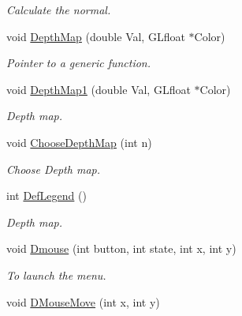 \begin{DoxyCompactItemize}
\begin{DoxyCompactList}\small\item\em \-Calculate the normal. \end{DoxyCompactList}\item 
\hypertarget{classDraw_ab3d9c36aceb9e5f4b158eb15b47c2003}{void \hyperlink{classDraw_ab3d9c36aceb9e5f4b158eb15b47c2003}{\-Depth\-Map} (double \-Val, \-G\-Lfloat $\ast$\-Color)}\label{classDraw_ab3d9c36aceb9e5f4b158eb15b47c2003}

\begin{DoxyCompactList}\small\item\em \-Pointer to a generic function. \end{DoxyCompactList}\item 
\hypertarget{classDraw_a6c0ca0bd4c1c0efc555672b6671535bc}{void \hyperlink{classDraw_a6c0ca0bd4c1c0efc555672b6671535bc}{\-Depth\-Map1} (double \-Val, \-G\-Lfloat $\ast$\-Color)}\label{classDraw_a6c0ca0bd4c1c0efc555672b6671535bc}

\begin{DoxyCompactList}\small\item\em \-Depth map. \end{DoxyCompactList}\item 
\hypertarget{classDraw_af5edc3c8867513cbb290646b3e0e20ff}{void \hyperlink{classDraw_af5edc3c8867513cbb290646b3e0e20ff}{\-Choose\-Depth\-Map} (int n)}\label{classDraw_af5edc3c8867513cbb290646b3e0e20ff}

\begin{DoxyCompactList}\small\item\em \-Choose \-Depth map. \end{DoxyCompactList}\item 
\hypertarget{classDraw_a5456e2c12fe02429ecf5bc09273ac3ed}{int \hyperlink{classDraw_a5456e2c12fe02429ecf5bc09273ac3ed}{\-Def\-Legend} ()}\label{classDraw_a5456e2c12fe02429ecf5bc09273ac3ed}

\begin{DoxyCompactList}\small\item\em \-Depth map. \end{DoxyCompactList}\item 
\hypertarget{classDraw_a8332766d3980ae20e0fb7e2a290a59ea}{void \hyperlink{classDraw_a8332766d3980ae20e0fb7e2a290a59ea}{\-Dmouse} (int button, int state, int x, int y)}\label{classDraw_a8332766d3980ae20e0fb7e2a290a59ea}

\begin{DoxyCompactList}\small\item\em \-To launch the menu. \end{DoxyCompactList}\item 
\hypertarget{classDraw_a9794ec43c2f8cf4e106aad7e0c2e1b66}{void \hyperlink{classDraw_a9794ec43c2f8cf4e106aad7e0c2e1b66}{\-D\-Mouse\-Move} (int x, int y)}\label{classDraw_a9794ec43c2f8cf4e106aad7e0c2e1b66}


\end{DoxyCompactItemize}
